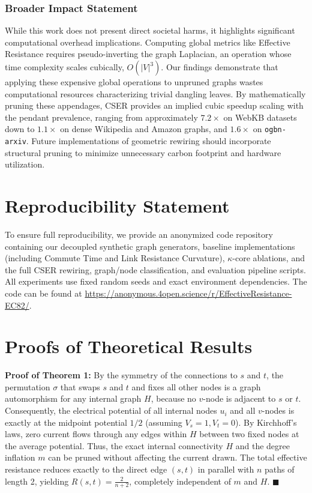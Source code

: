 \documentclass[10pt]{article} %
\begin{document}
\subsubsection*{Broader Impact Statement}
While this work does not present direct societal harms, it highlights significant computational overhead implications. Computing global metrics like Effective Resistance requires pseudo-inverting the graph Laplacian, an operation whose time complexity scales cubically, $O(|V|^3)$. Our findings demonstrate that applying these expensive global operations to unpruned graphs wastes computational resources characterizing trivial dangling leaves. By mathematically pruning these appendages, CSER provides an implied cubic speedup scaling with the pendant prevalence, ranging from approximately $7.2\times$ on WebKB datasets down to $1.1\times$ on dense Wikipedia and Amazon graphs, and $1.6\times$ on \texttt{ogbn-arxiv}. Future implementations of geometric rewiring should incorporate structural pruning to minimize unnecessary carbon footprint and hardware utilization.

\section{Reproducibility Statement}
To ensure full reproducibility, we provide an anonymized code repository containing our decoupled synthetic graph generators, baseline implementations (including Commute Time and Link Resistance Curvature), $\kappa$-core ablations, and the full CSER rewiring, graph/node classification, and evaluation pipeline scripts. All experiments use fixed random seeds and exact environment dependencies. The code can be found at \url{https://anonymous.4open.science/r/EffectiveResistance-EC82/}.




\appendix
\section{Proofs of Theoretical Results}
\label{app:proofs}

\textbf{Proof of Theorem 1:} By the symmetry of the connections to $s$ and $t$, the permutation $\sigma$ that swaps $s$ and $t$ and fixes all other nodes is a graph automorphism for any internal graph $H$, because no $v$-node is adjacent to $s$ or $t$. Consequently, the electrical potential of all internal nodes $u_i$ and all $v$-nodes is exactly at the midpoint potential $1/2$ (assuming $V_s=1, V_t=0$). By Kirchhoff's laws, zero current flows through any edges within $H$ between two fixed nodes at the average potential. Thus, the exact internal connectivity $H$ and the degree inflation $m$ can be pruned without affecting the current drawn. The total effective resistance reduces exactly to the direct edge $(s,t)$ in parallel with $n$ paths of length 2, yielding $R(s,t) = \frac{2}{n+2}$, completely independent of $m$ and $H$. $\blacksquare$
\end{document}
